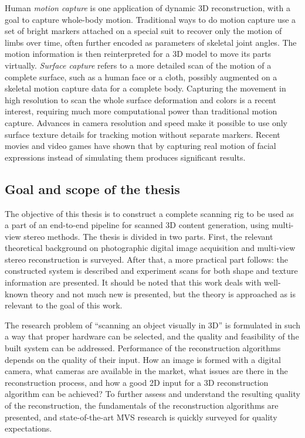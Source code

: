 
Human \emph{motion capture} is one application of dynamic 3D reconstruction, with a goal to capture whole-body motion.
Traditional ways to do motion capture use a set of bright markers attached on a special suit to recover only the motion of limbs over time, often further encoded as parameters of skeletal joint angles.
The motion information is then reinterpreted for a 3D model to move its parts virtually.
\emph{Surface capture} refers to a more detailed scan of the motion of a complete surface, such as a human face or a cloth, possibly augmented on a skeletal motion capture data for a complete body.
Capturing the movement in high resolution to scan the whole surface deformation and colors is a recent interest, requiring much more computational power than traditional motion capture.
Advances in camera resolution and speed make it possible to use only surface texture details for tracking motion without separate markers.
Recent movies and video games have shown that by capturing real motion of facial expressions instead of simulating them produces significant results.


\subsection{Goal and scope of the thesis}


The objective of this thesis is to construct a complete scanning rig to be used as a part of an end-to-end pipeline for scanned 3D content generation, using multi-view stereo methods.
The thesis is divided in two parts.
First, the relevant theoretical background on photographic digital image acquisition and multi-view stereo reconstruction is surveyed.
After that, a more practical part follows: the constructed system is described and experiment scans for both shape and texture information are presented.
It should be noted that this work deals with well-known theory and not much new is presented, but the theory is approached as is relevant to the goal of this work.


The research problem of ``scanning an object visually in 3D'' is formulated in such a way that proper hardware can be selected, and the quality and feasibility of the built system can be addressed.
Performance of the reconstruction algorithms depends on the quality of their input.
How an image is formed with a digital camera, what cameras are available in the market, what issues are there in the reconstruction process, and how a good 2D input for a 3D reconstruction algorithm can be achieved?
To further assess and understand the resulting quality of the reconstruction, the fundamentals of the reconstruction algorithms are presented, and state-of-the-art MVS research is quickly surveyed for quality expectations.

